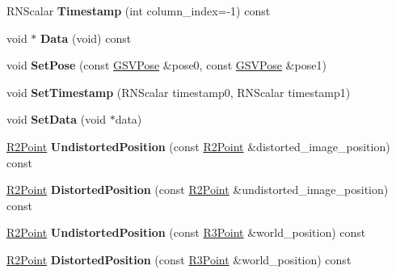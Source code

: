 \begin{DoxyCompactItemize}
\item 
R\+N\+Scalar {\bfseries Timestamp} (int column\+\_\+index=-\/1) const \hypertarget{class_g_s_v_image_a5d0d08269e09f6c81c972b76b8f920fe}{}\label{class_g_s_v_image_a5d0d08269e09f6c81c972b76b8f920fe}

\item 
void $\ast$ {\bfseries Data} (void) const \hypertarget{class_g_s_v_image_af988781cab75c75f5705fa52eb3c8fe3}{}\label{class_g_s_v_image_af988781cab75c75f5705fa52eb3c8fe3}

\item 
void {\bfseries Set\+Pose} (const \hyperlink{class_g_s_v_pose}{G\+S\+V\+Pose} \&pose0, const \hyperlink{class_g_s_v_pose}{G\+S\+V\+Pose} \&pose1)\hypertarget{class_g_s_v_image_a9f181c81ef9a2a45e3b27e0dd0c8892e}{}\label{class_g_s_v_image_a9f181c81ef9a2a45e3b27e0dd0c8892e}

\item 
void {\bfseries Set\+Timestamp} (R\+N\+Scalar timestamp0, R\+N\+Scalar timestamp1)\hypertarget{class_g_s_v_image_a9820d91d5e931d605304c4ef4f099698}{}\label{class_g_s_v_image_a9820d91d5e931d605304c4ef4f099698}

\item 
void {\bfseries Set\+Data} (void $\ast$data)\hypertarget{class_g_s_v_image_acca99117f27b7662a969448c107b2600}{}\label{class_g_s_v_image_acca99117f27b7662a969448c107b2600}

\item 
\hyperlink{class_r2_point}{R2\+Point} {\bfseries Undistorted\+Position} (const \hyperlink{class_r2_point}{R2\+Point} \&distorted\+\_\+image\+\_\+position) const \hypertarget{class_g_s_v_image_a686bfd49c01cda856c313e77bfead9bb}{}\label{class_g_s_v_image_a686bfd49c01cda856c313e77bfead9bb}

\item 
\hyperlink{class_r2_point}{R2\+Point} {\bfseries Distorted\+Position} (const \hyperlink{class_r2_point}{R2\+Point} \&undistorted\+\_\+image\+\_\+position) const \hypertarget{class_g_s_v_image_abdf980817eb29f507e68b6817d1e19c3}{}\label{class_g_s_v_image_abdf980817eb29f507e68b6817d1e19c3}

\item 
\hyperlink{class_r2_point}{R2\+Point} {\bfseries Undistorted\+Position} (const \hyperlink{class_r3_point}{R3\+Point} \&world\+\_\+position) const \hypertarget{class_g_s_v_image_a4ca01fa0ac13fdba0b0957ce2a12974e}{}\label{class_g_s_v_image_a4ca01fa0ac13fdba0b0957ce2a12974e}

\item 
\hyperlink{class_r2_point}{R2\+Point} {\bfseries Distorted\+Position} (const \hyperlink{class_r3_point}{R3\+Point} \&world\+\_\+position) const \hypertarget{class_g_s_v_image_a1c0848181311667e3f551ab46d4563f5}{}\label{class_g_s_v_image_a1c0848181311667e3f551ab46d4563f5}


\end{DoxyCompactItemize}
